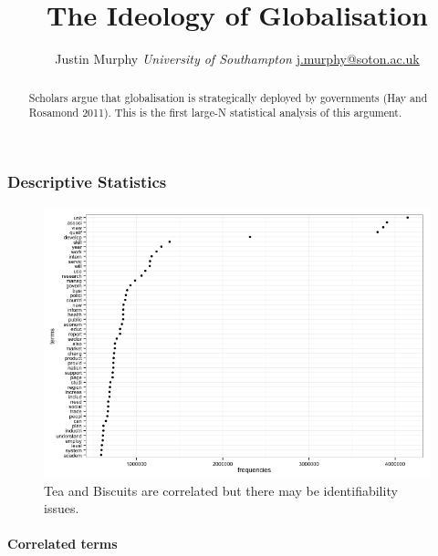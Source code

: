 \documentclass[11pt,article,oneside]{memoir}
\title{\bigskip \bigskip The Ideology of Globalisation}
\author{\Large Justin Murphy\vspace{0.05in} \newline\normalsize\emph{University of Southampton} \newline\footnotesize \url{j.murphy@soton.ac.uk}\vspace*{0.2in}\newline }
\date{}
\makeatletter
\def\maxwidth{\ifdim\Gin@nat@width>\linewidth\linewidth
\else\Gin@nat@width\fi}
\let\Oldincludegraphics\includegraphics
\renewcommand{\includegraphics}[1]{\Oldincludegraphics[width=\maxwidth]{#1}}
\makeatother
\begin{document}
  
\setsansfont[Mapping=tex-text]{Gill Sans} 
\setmonofont[Mapping=tex-text,Scale=0.8]{Consolas}

\doublespacing


\maketitle



\begin{abstract}

\noindent Scholars argue that globalisation is strategically deployed by
governments (Hay and Rosamond 2011). This is the first large-N
statistical analysis of this argument.

\end{abstract}


\subsubsection{Descriptive Statistics}\label{descriptive-statistics}

\begin{figure}[htbp]
\centering
\includegraphics{figure/globalisation_frequency_plot.png}
\caption{Tea and Biscuits are correlated but there may be
identifiability issues.}
\end{figure}

\pagebreak

\paragraph{Correlated terms}\label{correlated-terms}
\end{document}

